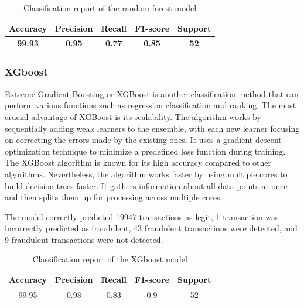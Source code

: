 \documentclass[a4paper,twocolumn,12pt]{article}
\begin{document}
\begin{table}[h!]
\centering
\begin{tabular}{||c c c c c||} 
 \hline
 Accuracy & Precision & Recall & F1-score & Support \\ [0.5ex] 
 \hline\hline
 \textbf{99.93} & \textbf{0.95} & \textbf{0.77} & \textbf{0.85} & \textbf{52} \\ 
 \hline
\end{tabular}
\caption{Classification report of the random forest model}
\label{table:1}
\end{table}





\subsubsection{XGboost}

Extreme Gradient Boosting or XGBoost is another classification method that can perform various functions such as regression classification and ranking. The most crucial advantage of XGBoost is its scalability.\cite{permai2023prediction} The algorithm works by sequentially adding weak learners to the ensemble, with each new learner focusing on correcting the errors made by the existing ones. It uses a gradient descent optimization technique to minimize a predefined loss function during training.\cite{XGboost} The XGBoost algorithm is known for its high accuracy compared to other algorithms. Nevertheless, the algorithm works faster by using multiple cores to build decision trees faster. It gathers information about all data points at once and then splits them up for processing across multiple cores. 


The model correctly predicted 19947 transactions as legit, 1 transaction was incorrectly predicted as fraudulent, 43 fraudulent transactions were detected, and 9 fraudulent transactions were not detected.


\begin{table}[h!]
\centering
\begin{tabular}{||c c c c c||} 
 \hline
 Accuracy & Precision & Recall & F1-score & Support \\ [0.5ex] 
 \hline\hline
 99.95 & 0.98 & 0.83 & 0.9 & 52 \\ 
 \hline
\end{tabular}
\caption{Classification report of the XGboost model}
\label{table:2}
\end{table}
\end{document}
